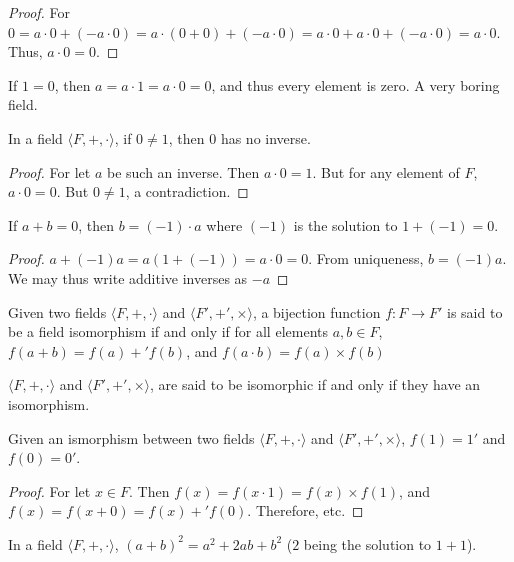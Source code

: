         \begin{proof}
        For $0 = a\cdot 0 + (-a\cdot 0) = a\cdot(0+0) +(-a\cdot 0) = a\cdot 0 + a\cdot 0 + (-a\cdot 0) = a\cdot 0$. Thus, $a\cdot 0 = 0$.
        \end{proof}
        If $1=0$, then $a=a\cdot 1 = a\cdot 0 = 0$, and thus
        every element is zero. A very boring field.
        \begin{theorem}
            In a field $\langle{F,+,\cdot}\rangle$, if
            $0\ne{1}$, then $0$ has no inverse.
        \end{theorem}
        \begin{proof}
        For let $a$ be such an inverse. Then $a\cdot 0 = 1$. But for any element of $F$, $a \cdot 0 = 0$. But $0\ne 1$, a contradiction.
        \end{proof}
        \begin{theorem}
        If $a+b = 0$, then $b= (-1)\cdot a$ where $(-1)$ is the solution to $1+(-1)=0$.
        \end{theorem}
        \begin{proof}
        $a+(-1)a = a(1+(-1)) = a\cdot 0 = 0$. From uniqueness, $b=(-1)a$. We may thus write additive inverses as $-a$
        \end{proof}
        \begin{definition}
        Given two fields $\langle F,+,\cdot \rangle$ and $\langle F', +',\times \rangle$, a bijection function $f:F\rightarrow F'$ is said to be a field isomorphism if and only if for all elements $a,b\in F$, $f(a+b)=f(a)+'f(b)$, and $f(a\cdot b) = f(a)\times f(b)$
        \end{definition}
        \begin{definition}
        $\langle F,+,\cdot \rangle$ and $\langle F', +',\times \rangle$, are said to be isomorphic if and only if they have an isomorphism.
        \end{definition}
        \begin{theorem}
        Given an ismorphism between two fields $\langle F,+,\cdot \rangle$ and $\langle F', +',\times \rangle$, $f(1) = 1'$ and $f(0) = 0'$.
        \end{theorem}
        \begin{proof}
        For let $x\in F$. Then $f(x)=f(x\cdot 1) = f(x)\times f(1)$, and $f(x)=f(x+0) = f(x)+'f(0)$. Therefore, etc.
        \end{proof}
        \begin{theorem}
        In a field $\langle F,+,\cdot \rangle$, $(a+ b)^2 = a^2 + 2ab + b^2$ ($2$ being the solution to $1+1$).
        \end{theorem}
